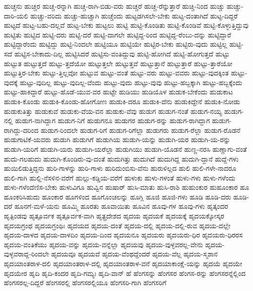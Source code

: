 {ಹುಚ್ಚನು
ಹುಚ್ಚರ
ಹುಚ್ಚ-ರನ್ನಾಗಿ
ಹುಚ್ಚ-ರಾಗಿ-ಬಿಡು-ವರು
ಹುಚ್ಚರೆ
ಹುಚ್ಚ-ರೆನ್ನುತ್ತಾರೆ
ಹುಚ್ಚಿ-ನಿಂದ
ಹುಚ್ಚು
ಹುಚ್ಚು-ದಾರಿ-ಯಲಿ
ಹುಚ್ಚು-ವರಿದು
ಹುಚ್ಚು-ಹುಚ್ಚಾಗಿ
ಹುಚ್ಚೆಂದು
ಹುಟ್ಟಡಗಿಸಲೇ-ಬೇಕು
ಹುಟ್ಟ-ದಂತಾಗಿದೆ
ಹುಟ್ಟ-ದಿದ್ದರೆ
ಹುಟ್ಟದೆ
ಹುಟ್ಟ-ಬಹು-ದಲ್ಲವೆ
ಹುಟ್ಟ-ಬೇಕು
ಹುಟ್ಟಲು
ಹುಟ್ಟಿ
ಹುಟ್ಟಿ-ಕೊಂಡಿತು
ಹುಟ್ಟಿ-ಕೊಂಡಿವೆ
ಹುಟ್ಟಿ-ಕೊಳ್ಳುತ್ತಿದ್ದುವು
ಹುಟ್ಟಿತು
ಹುಟ್ಟಿದ
ಹುಟ್ಟಿ-ದರು
ಹುಟ್ಟಿ-ದರೆ
ಹುಟ್ಟಿ-ದಾಗಲೇ
ಹುಟ್ಟಿದ್ದ-ರಿಂದ
ಹುಟ್ಟಿದ್ದ-ರೆಂಬು-ದನ್ನು
ಹುಟ್ಟಿದ್ದಾರೆ
ಹುಟ್ಟಿದ್ದಾರೆಂದು
ಹುಟ್ಟಿದ್ದು
ಹುಟ್ಟಿ-ನಿಂದಲೇ
ಹುಟ್ಟಿಯೂ
ಹುಟ್ಟಿಯೇ
ಹುಟ್ಟಿರ-ಬೇಕು
ಹುಟ್ಟಿರು-ವುದು
ಹುಟ್ಟಿಲ್ಲ
ಹುಟ್ಟಿ-ಸದೆ
ಹುಟ್ಟಿಸ-ಬೇಕಾದು-ದಿಲ್ಲ
ಹುಟ್ಟಿಸಿದರೆ
ಹುಟ್ಟಿಸು-ವಂತಿದ್ದುವು
ಹುಟ್ಟಿ-ಹೋಗಿದೆ
ಹುಟ್ಟಿ-ಹೋಗುತ್ತದೆ
ಹುಟ್ಟು
ಹುಟ್ಟುತ
ಹುಟ್ಟುತ್ತದೆ
ಹುಟ್ಟು-ತ್ತದೆಯೋ
ಹುಟ್ಟುತ್ತಲೇ
ಹುಟ್ಟುತ್ತವೆ
ಹುಟ್ಟುತ್ತಾನೆ
ಹುಟ್ಟುತ್ತಾರೆ
ಹುಟ್ಟು-ತ್ತಾರೆಯೋ
ಹುಟ್ಟುತ್ತಿರ-ಬೇಕು
ಹುಟ್ಟು-ತ್ತಿಲ್ಲವೋ
ಹುಟ್ಟುವ
ಹುಟ್ಟು-ವಂತೆ
ಹುಟ್ಟು-ವರು
ಹುಟ್ಟು-ವವರು
ಹುಟ್ಟು-ವುದಕ್ಕಿಂತ
ಹುಟ್ಟು-ವುದಕ್ಕೆ
ಹುಟ್ಟು-ವುದಿಲ್ಲ
ಹುಟ್ಟು-ವುದಿಲ್ಲ-ವೆಂದು
ಹುಟ್ಟು-ವುದು
ಹುಟ್ಟು-ವುವು
ಹುಟ್ಟು-ಹಬ್ಬಕ್ಕಾಗಿ
ಹುಟ್ಟು-ಹಬ್ಬಕ್ಕೆಂದು
ಹುಟ್ಟು-ಹಾಕಿದ್ದಾರೆ
ಹುಟ್ಟು-ಹೊಡೆ-ಯುವ-ವರ
ಹುಟ್ಟೇ
ಹುಡಿಯು
ಹುಡಿಯೊಳ
ಹುಡುಕ-ಬೇಕೆಂದು
ಹುಡುಕಾಟ
ಹುಡುಕಿ-ಕೊಂಡು
ಹುಡುಕಿ-ಕೊಂಡು-ಹೋಗೋಣ
ಹುಡುಕಿ-ದರೂ
ಹುಡುಕಿ-ದೆನು
ಹುಡುಕಿದ್ದೇನೆ
ಹುಡುಕಿ-ನೋಡು
ಹುಡುಕುತಿತ್ತು
ಹುಡುಕುವೆ
ಹುಡುಕು-ವೆಯ-ವನ
ಹುಡುಕು-ವೆವು
ಹುಡುಗ
ಹುಡುಗ-ನಂತೆ
ಹುಡುಗ-ನಯ್ಯ
ಹುಡುಗ-ನಲ್ಲಿ
ಹುಡುಗ-ನಾಗಿದ್ದಾಗ
ಹುಡುಗ-ನಿಗೆ
ಹುಡುಗನೂ
ಹುಡುಗರ
ಹುಡುಗ-ರನ್ನು
ಹುಡುಗ-ರಾಗಿದ್ದಾಗ
ಹುಡುಗ-ರಾಗಿದ್ದು-ದರಿಂದ
ಹುಡುಗ-ರಿಂದಲೇ
ಹುಡುಗ-ರಿಗೆ
ಹುಡುಗ-ರಿಗೆಲ್ಲಾ
ಹುಡುಗರು
ಹುಡುಗ-ರೆಲ್ಲಾ
ಹುಡುಗ-ರೊಡನೆ
ಹುಡುಗಾಟಿಕೆ-ಯವರು
ಹುಡುಗಿ
ಹುಡುಗಿಗೆ
ಹುಡುಗಿಯ
ಹುಡುಗಿ-ಯನ್ನು
ಹುಡುಗಿ-ಯರ
ಹುಡುಗಿ-ಯ-ರನ್ನು
ಹುಡುಗಿ-ಯರಿಗೆ
ಹುಡುಗಿ-ಯರು
ಹುಡುಗಿ-ಯರೆಲ್ಲಾ
ಹುಡುಗಿಯು
ಹುಡುಗಿ-ಯೊಡನೆ
ಹುಣ್ಣ-ನರಸಿ
ಹುಣ್ಣಾಗು-ವಂತೆ
ಹುದು-ಗಲಹುದು
ಹುದುಗಿ-ಕೊಂಡಿರು-ವು-ದಂತೆ
ಹುದುಗಿತ್ತು
ಹುದುಗಿದೆ
ಹುದುಗಿದ್ದ
ಹುದುಗಿ-ದ್ದಾನೆ
ಹುದ್ದೆ-ಗಳು
ಹುಯಿಲಿಡುತ್ತಿದ್ದನು
ಹುರಿ-ಗಾಳನ್ನು
ಹುರಿ-ಗಾಳು
ಹುರಿದುಂಬಿಸು-ವೆನು
ಹುರುಳಿಲ್ಲದ
ಹುಲಿ
ಹುಲಿ-ಗಳೇ-ನಾದರೂ
ಹುಲಿ-ಗಾಗಿ
ಹುಲ್ಲಿ-ನೆಸಳಿನ-ವರೆಗೆ
ಹುಲ್ಲು-ಕಡ್ಡಿಯ-ವರೆಗೆ
ಹುಳುಕು
ಹುಳು-ಗಳಂತೆ
ಹುಳು-ಗಳು
ಹುಳು-ಗಳೆಂದು
ಹುಳು-ಗಳೆಂದೆಣಿಸ-ಬೇಕು
ಹುಳುವಿಗೂ
ಹುವ್ವಿನ
ಹುಷಾರ್
ಹುಸಿ-ಮಾತು
ಹುಸಿ-ರಾಶಿ
ಹುಹುಂಕುರ
ಹುಹೂಂಕಾರ
ಹೂ
ಹೂಂಕರಿಸಿಹುದು
ಹೂಂಕಾರ
ಹೂಗಳಿಂದ
ಹೂಗೊಂಚಲನ್ನು
ಹೂಗ್ಲಿ
ಹೂಜಿ
ಹೂಜಿ-ಗಳು
ಹೂಡಿ
ಹೂಡಿ-ದರು
ಹೂಡಿ-ದರೆ
ಹೂನಗೆ-ಮಳೆ-ಯನು
ಹೂಮ್ಮಿ
ಹೂರತು
ಹೂವಾಯಿತು
ಹೂವಿನ
ಹೂವು-ಗಳ
ಹೂವು-ಗಳು
ಹೃತ್ಕಂದರ
ಹೃತ್ಪಿಂಡವು
ಹೃತ್ಪೂರ್ವಕ
ಹೃತ್ಪೂರ್ವಕ-ವಾಗಿ
ಹೃತ್ಪ್ರದೇಶದ
ಹೃದಯ
ಹೃದಯಕೆ
ಹೃದಯಕ್ಕೆ
ಹೃದಯಕ್ಕೋಸ್ಕರ
ಹೃದಯಗ್ರಂಥ
ಹೃದಯಗ್ರಂಥಿಃ
ಹೃದಯದ
ಹೃದಯ-ದಂತೆ
ಹೃದಯ-ದಲ್ಲಿ
ಹೃದಯ-ದಲ್ಲಿ-ರುವ
ಹೃದಯ-ದಲ್ಲೇ
ಹೃದಯ-ದಾಳದ
ಹೃದಯ-ದಾಳದಿಂ
ಹೃದಯ-ದಿಂದ
ಹೃದಯನೂ
ಹೃದಯರು
ಹೃದಯರು-ಧಿರ
ಹೃದಯರು-ಧಿರರಸ
ಹೃದಯ-ವಂತಿಕೆಯು
ಹೃದಯ-ವನ್ನು
ಹೃದಯ-ವನ್ನೆಲ್ಲಾ
ಹೃದಯವು
ಹೃದಯ-ವುಳ್ಳವರಲ್ಲ-ವೇನು
ಹೃದಯ-ವುಳ್ಳವರಾದ್ದ-ರಿಂದಲೇ
ಹೃದಯವೂ
ಹೃದಯವೆ
ಹೃದಯ-ವೆಂಥದ್ದೆಂದರೆ
ಹೃದಯ-ವೆಲ್ಲ
ಹೃದಯ-ಸ್ಮಶಾನ
ಹೃದಯಾಂತರಾಳ-ದಲಿ
ಹೃದಯಾಂತರಾಳ-ದಲ್ಲಿ
ಹೃದಯಾಂತರಾಳ-ವನೆ
ಹೃದಯಾಕಾಂಕ್ಷೆ-ಯನ್ನು
ಹೃದಯೆ
ಹೃದಯೇ
ಹೃದಯೇರ
ಹೃದಿ
ಹೃದಿ-ಕಂದರ
ಹೃದಿ-ಗಮ್ಯಃ
ಹೃದಿ-ವಾನ್
ಹೆ
ಹೆಂಗಸನ್ನು
ಹೆಂಗಸರ
ಹೆಂಗಸ-ರನ್ನು
ಹೆಂಗಸರನ್ನೆಲ್ಲಿಂದ
ಹೆಂಗಸರಲ್ಲ-ದಿದ್ದರೆ
ಹೆಂಗಸರಲ್ಲಿ
ಹೆಂಗಸರಲ್ಲಿಯೂ
ಹೆಂಗಸರಿ-ಗಾಗಿ
ಹೆಂಗಸರಿಗೆ
}
